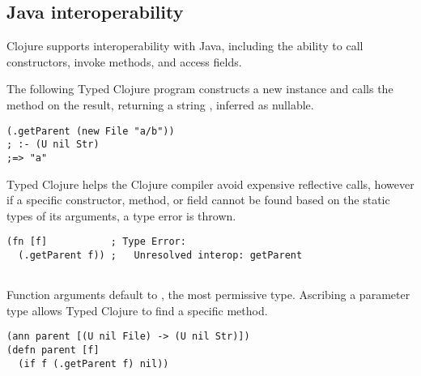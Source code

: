 \subsection{Java interoperability}
\label{sec:overviewjavainterop}

Clojure supports interoperability with Java, including the ability to
call constructors, invoke methods, and access fields.

The following Typed Clojure program constructs a new 
instance and calls the  method on the result,
returning a string , inferred as nullable.

\begin{exmp}
\begin{verbatim}
(.getParent (new File "a/b"))  
; :- (U nil Str)
;=> "a"
\end{verbatim}
\label{example:getparent-direct-constructor}
\end{exmp}

Typed Clojure helps the Clojure compiler avoid expensive reflective 
calls,
however if a specific constructor, method, or field cannot be found based on the
static types of its arguments, a type error is thrown.

\begin{verbatim}
(fn [f]           ; Type Error:                    
  (.getParent f)) ;   Unresolved interop: getParent
                  
\end{verbatim}

Function arguments default to , the most permissive type. Ascribing
a parameter type allows Typed Clojure to find a specific method.


\begin{exmp}
\begin{verbatim}
(ann parent [(U nil File) -> (U nil Str)])
(defn parent [f]
  (if f (.getParent f) nil))
\end{verbatim}
\label{example:parent-if}
\end{exmp}


